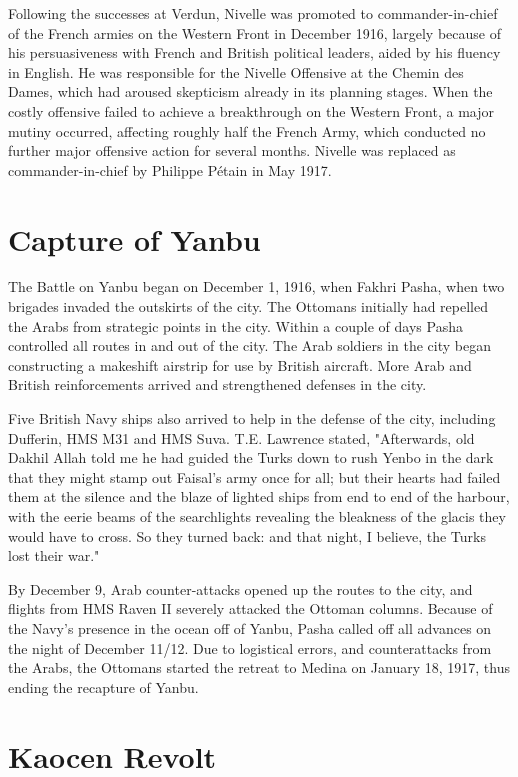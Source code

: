 \documentclass[a4paper,]{book}
\begin{document}
Following the successes at Verdun, Nivelle was promoted to commander-in-chief of the French armies on the Western Front in December 1916, largely because of his persuasiveness with French and British political leaders, aided by his fluency in English. He was responsible for the Nivelle Offensive at the Chemin des Dames, which had aroused skepticism already in its planning stages. When the costly offensive failed to achieve a breakthrough on the Western Front, a major mutiny occurred, affecting roughly half the French Army, which conducted no further major offensive action for several months. Nivelle was replaced as commander-in-chief by Philippe Pétain in May 1917. 

\section{Capture of Yanbu}

The Battle on Yanbu began on December 1, 1916, when Fakhri Pasha, when two brigades invaded the outskirts of the city. The Ottomans initially had repelled the Arabs from strategic points in the city. Within a couple of days Pasha controlled all routes in and out of the city. The Arab soldiers in the city began constructing a makeshift airstrip for use by British aircraft. More Arab and British reinforcements arrived and strengthened defenses in the city.

Five British Navy ships also arrived to help in the defense of the city, including Dufferin, HMS M31 and HMS Suva. T.E. Lawrence stated, "Afterwards, old Dakhil Allah told me he had guided the Turks down to rush Yenbo in the dark that they might stamp out Faisal's army once for all; but their hearts had failed them at the silence and the blaze of lighted ships from end to end of the harbour, with the eerie beams of the searchlights revealing the bleakness of the glacis they would have to cross. So they turned back: and that night, I believe, the Turks lost their war."

By December 9, Arab counter-attacks opened up the routes to the city, and flights from HMS Raven II severely attacked the Ottoman columns. Because of the Navy's presence in the ocean off of Yanbu, Pasha called off all advances on the night of December 11/12. Due to logistical errors, and counterattacks from the Arabs, the Ottomans started the retreat to Medina on January 18, 1917, thus ending the recapture of Yanbu. 

\section{Kaocen Revolt}
\end{document}
